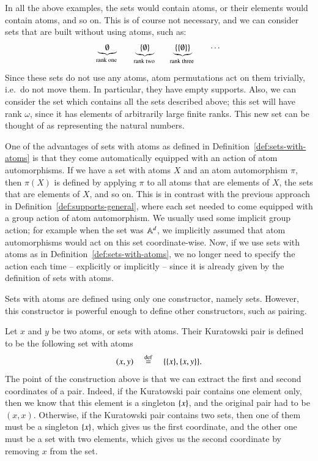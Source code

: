 \begin{myexample}\label{ex:atomless-sets}
	In all the above examples, the sets would contain atoms, or their elements would contain atoms, and so on. This is of course not necessary, and we can consider sets that are built without using atoms, such as: 
	\begin{align*}
	\myunderbrace{ \emptyset }{rank one}
	\qquad 
	\myunderbrace{ \set{ \emptyset }}{rank two}
	\qquad
	\myunderbrace{ \set{ \set{\emptyset}}}{rank three} 
	\qquad \cdots
	\end{align*}
	Since these sets do not use any atoms, atom permutations act on them trivially, i.e.~do not move them. In particular, they have empty supports. Also, we can consider the set which contains all  the sets described above; this set will have rank $\omega$, since it has elements of arbitrarily large finite ranks. This new set can be thought of as representing the natural numbers. 
\end{myexample}

One of the advantages of sets with atoms as defined in Definition~\ref{def:sets-with-atoms} is that they come automatically equipped with an action of atom automorphisms. If we have a set with atoms $X$ and an atom automorphism $\pi$, then $\pi(X)$ is defined by applying $\pi$ to all atoms that are elements of  $X$, the sets that are elements of $X$, and so on.  This is in contrast with the previous approach in  Definition~\ref{def:supports-general}, where each set needed to come  equipped with a group action of atom automorphism. We usually used some implicit group action; for example when the set was $\mathbb A^d$, we implicitly assumed that atom automorphisms would act on this set coordinate-wise. Now, if we use sets with atoms as in Definition~\ref{def:sets-with-atoms}, we no longer need to specify the action each time -- explicitly or implicitly -- since it is already given by the definition of sets with atoms. 

Sets with atoms are defined using only one constructor, namely sets. However, this constructor is powerful enough to define other constructors, such as  pairing.


\begin{myexample}
	[Pairing]\label{ex:kuratowski-pairing}
	Let $x$ and $y$ be two atoms, or sets with atoms. Their Kuratowski pair is defined to be the following set with atoms 
	\begin{align*}
	(x,y)  \quad \stackrel {\mathrm{def}} = \quad  \{ \{x\}, \{x,y\}\}.
	\end{align*}
	The point of the construction above is that we can extract the first and second coordinates of a pair. Indeed, if the Kuratowski pair contains one element only, then we know that this element is a singleton $\{x\}$, and the original pair had to be $(x,x)$. Otherwise, if the Kuratowski pair contains two sets, then one of them must be a singleton $\{x\}$, which gives us the first coordinate, and the  other one must be a set with two elements, which gives us the second coordinate by removing $x$ from the set. 
\end{myexample}

